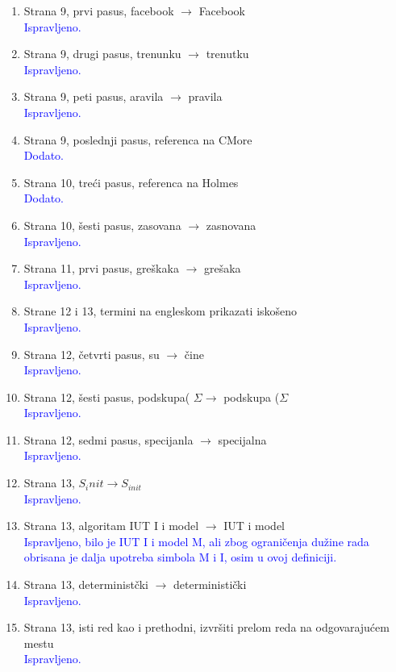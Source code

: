 \documentclass[a4paper]{report}
\newcommand{\odgovor}[1]{\textcolor{blue}{#1}}
\begin{document}
\begin{enumerate}
\item Strana 9, prvi pasus, facebook $\rightarrow$ Facebook
\\ \odgovor{Ispravljeno.}

\item Strana 9, drugi pasus, trenunku $\rightarrow$ trenutku
\\ \odgovor{Ispravljeno.}

\item Strana 9, peti pasus, aravila $\rightarrow$ pravila
\\ \odgovor{Ispravljeno.}

\item Strana 9, poslednji pasus, referenca na CMore
\\ \odgovor{Dodato.}

\item Strana 10, treći pasus, referenca na Holmes
\\ \odgovor{Dodato.}

\item Strana 10, šesti pasus, zasovana $\rightarrow$ zasnovana
\\ \odgovor{Ispravljeno.}

\item Strana 11, prvi pasus, greškaka $\rightarrow$ grešaka
\\ \odgovor{Ispravljeno.}

\item Strane 12 i 13, termini na engleskom prikazati iskošeno
\\ \odgovor{Ispravljeno.}

\item Strana 12, četvrti pasus, su $\rightarrow$ čine
\\ \odgovor{Ispravljeno.}

\item Strana 12, šesti pasus, podskupa( $\Sigma \rightarrow$ podskupa ($\Sigma$
\\ \odgovor{Ispravljeno.}

\item Strana 12, sedmi pasus, specijanla $\rightarrow$ specijalna
\\ \odgovor{Ispravljeno.}

\item Strana 13, $S_init \rightarrow S_{init}$
\\ \odgovor{Ispravljeno.}

\item Strana 13, algoritam IUT I i model $\rightarrow$ IUT i model
\\ \odgovor{Ispravljeno, bilo je IUT I i model M, ali zbog ograničenja dužine rada obrisana je dalja upotreba simbola M i I, osim u ovoj definiciji.}

\item Strana 13, deterministčki $\rightarrow$ deterministički
\\ \odgovor{Ispravljeno.}

\item Strana 13, isti red kao i prethodni, izvršiti prelom reda na odgovarajućem mestu
\\ \odgovor{Ispravljeno.}
\end{enumerate}
\end{document}
